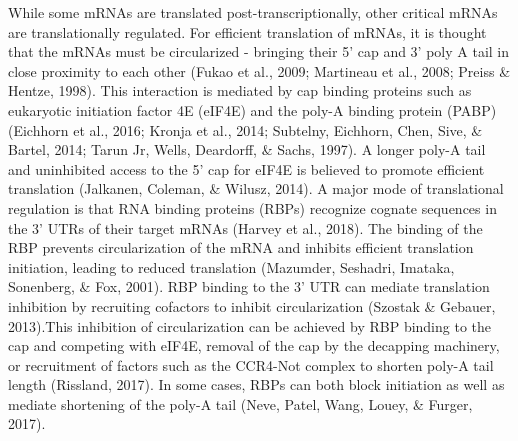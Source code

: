 \documentclass[12pt,twoside]{reedthesis}
\begin{document}
While some mRNAs are translated post-transcriptionally, other critical
mRNAs are translationally regulated. For efficient translation of mRNAs,
it is thought that the mRNAs must be circularized - bringing their 5'
cap and 3' poly A tail in close proximity to each other (Fukao et al., 2009; Martineau et al., 2008; Preiss \& Hentze, 1998). This interaction is mediated by cap
binding proteins such as eukaryotic initiation factor 4E (eIF4E) and the
poly-A binding protein (PABP)(Eichhorn et al., 2016; Kronja et al., 2014; Subtelny, Eichhorn, Chen, Sive, \& Bartel, 2014; Tarun Jr, Wells, Deardorff, \& Sachs, 1997). A longer poly-A tail and uninhibited
access to the 5' cap for eIF4E is believed to promote efficient
translation (Jalkanen, Coleman, \& Wilusz, 2014). A major mode of translational
regulation is that RNA binding proteins (RBPs) recognize cognate
sequences in the 3' UTRs of their target mRNAs (Harvey et al., 2018). The
binding of the RBP prevents circularization of the mRNA and inhibits
efficient translation initiation, leading to reduced translation
(Mazumder, Seshadri, Imataka, Sonenberg, \& Fox, 2001). RBP binding to the 3' UTR can mediate translation
inhibition by recruiting cofactors to inhibit circularization
(Szostak \& Gebauer, 2013).This inhibition of circularization can be achieved by
RBP binding to the cap and competing with eIF4E, removal of the cap by
the decapping machinery, or recruitment of factors such as the CCR4-Not
complex to shorten poly-A tail length (Rissland, 2017). In some
cases, RBPs can both block initiation as well as mediate shortening of
the poly-A tail (Neve, Patel, Wang, Louey, \& Furger, 2017).
\end{document}
